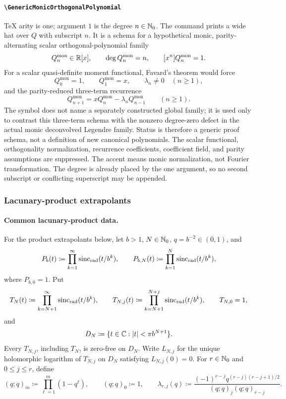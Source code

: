\documentclass[11pt,oneside]{article}
\theoremstyle{definition}
\theoremstyle{remark}
\DeclareRobustCommand{\commandname}[1]{\texttt{\textbackslash#1}}
\DeclareRobustCommand{\localaccentname}[1]{\commandname{#1}}
\begin{document}
\paragraph{\localaccentname{GenericMonicOrthogonalPolynomial}}
TeX arity is one; argument \(1\) is the degree
\(n\in\mathbb{N}_{0}\).  The command prints a wide hat over \(Q\) with
subscript \(n\).  It is a schema for a hypothetical monic,
parity-alternating scalar orthogonal-polynomial family
\[
 Q_n^{\mathrm{mon}}\in\mathbb{R}[x],\qquad
 \deg Q_n^{\mathrm{mon}}=n,\qquad
 [x^n]Q_n^{\mathrm{mon}}=1.
\]
For a scalar quasi-definite moment functional, Favard's theorem would force
\[
 Q_0^{\mathrm{mon}}=1,\qquad Q_1^{\mathrm{mon}}=x,
 \qquad \lambda_n\ne0\quad(n\ge1),
\]
and the parity-reduced three-term recurrence
\[
 Q_{n+1}^{\mathrm{mon}}
 =
 xQ_n^{\mathrm{mon}}-\lambda_nQ_{n-1}^{\mathrm{mon}}
 \qquad(n\ge1).
\]
The symbol does not name a separately constructed global family; it is used
only to contrast this three-term schema with the nonzero degree-zero defect
in the actual monic deconvolved Legendre family.  Status is therefore a
generic proof schema, not a definition of new canonical polynomials.  The
scalar functional, orthogonality normalization, recurrence coefficients,
coefficient field, and parity assumptions are suppressed.  The accent means
monic normalization, not Fourier transformation.  The degree is already
placed by the one argument, so no second subscript or conflicting superscript
may be appended.

\subsubsection{Lacunary-product extrapolants}

\paragraph{Common lacunary-product data.}
For the product extrapolants below, let \(b>1\), \(N\in\mathbb{N}_{0}\),
\(q=b^{-2}\in(0,1)\), and
\[
 P_b(t)\coloneqq\prod_{k=1}^{\infty}\operatorname{sinc}_{\mathrm{rad}}(t/b^k),\qquad
 P_{b,N}(t)\coloneqq\prod_{k=1}^{N}\operatorname{sinc}_{\mathrm{rad}}(t/b^k),
\]
where \(P_{b,0}=1\).  Put
\[
 T_N(t)\coloneqq\prod_{k=N+1}^{\infty}\operatorname{sinc}_{\mathrm{rad}}(t/b^k),\qquad
 T_{N,j}(t)\coloneqq\prod_{k=N+1}^{N+j}\operatorname{sinc}_{\mathrm{rad}}(t/b^k),
 \qquad T_{N,0}=1,
\]
and
\[
 D_N\coloneqq
 \{t\in\mathbb{C}:\left\lvert t\right\rvert<\pi b^{N+1}\}.
\]
Every \(T_{N,j}\), including \(T_N\), is zero-free on \(D_N\).  Write
\(L_{N,j}\) for the unique holomorphic logarithm of \(T_{N,j}\) on \(D_N\)
satisfying \(L_{N,j}(0)=0\).  For \(r\in\mathbb{N}_{0}\) and
\(0\le j\le r\), define
\[
 (q;q)_m\coloneqq\prod_{\ell=1}^{m}(1-q^\ell),\qquad (q;q)_0\coloneqq1,
 \qquad
 \lambda_{r,j}(q)\coloneqq
 \frac{(-1)^{r-j}q^{(r-j)(r-j+1)/2}}
      {(q;q)_j(q;q)_{r-j}}.
\]
\end{document}
